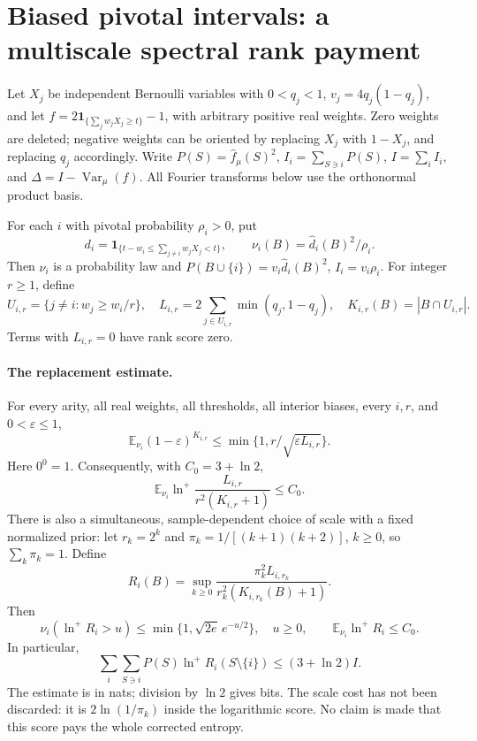 \section{Biased pivotal intervals: a multiscale spectral rank payment}
\label{a041:replacement}
Let $X_j$ be independent Bernoulli variables with $0<q_j<1$,
$v_j=4q_j(1-q_j)$, and let
$f=2\mathbf1_{\{\sum_j w_jX_j\ge t\}}-1$, with arbitrary positive real
weights. Zero weights are deleted; negative weights can be oriented by
replacing $X_j$ with $1-X_j$, and replacing $q_j$ accordingly.
Write $P(S)=\widehat f_\mu(S)^2$, $I_i=\sum_{S\ni i}P(S)$,
$I=\sum_iI_i$, and $\Delta=I-\operatorname{Var}_\mu(f)$.
All Fourier transforms below use the orthonormal product basis.

For each $i$ with pivotal probability $\rho_i>0$, put
\[
 d_i=\mathbf1_{\{t-w_i\le\sum_{j\ne i}w_jX_j<t\}},\qquad
 \nu_i(B)=\widehat d_i(B)^2/\rho_i.
\]
Then $\nu_i$ is a probability law and
$P(B\cup\{i\})=v_i\widehat d_i(B)^2$, $I_i=v_i\rho_i$.
For integer $r\ge1$, define
\[
 U_{i,r}=\{j\ne i:w_j\ge w_i/r\},\quad
 L_{i,r}=2\sum_{j\in U_{i,r}}\min(q_j,1-q_j),\quad
 K_{i,r}(B)=|B\cap U_{i,r}|.
\]
Terms with $L_{i,r}=0$ have rank score zero.

\paragraph{The replacement estimate.}
For every arity, all real weights, all thresholds, all interior biases,
every $i,r$, and $0<\varepsilon\le1$,
\begin{equation}\label{a041:noise}
 \mathbb E_{\nu_i}(1-\varepsilon)^{K_{i,r}}
 \le \min\{1,r/\sqrt{\varepsilon L_{i,r}}\}.
\end{equation}
Here $0^0=1$. Consequently, with $C_0=3+\ln2$,
\begin{equation}\label{a041:fixedrank}
 \mathbb E_{\nu_i}\ln^+
 \frac{L_{i,r}}{r^2(K_{i,r}+1)}\le C_0.
\end{equation}
There is also a simultaneous, sample-dependent choice of scale with a
fixed normalized prior: let $r_k=2^k$ and
$\pi_k=1/[(k+1)(k+2)]$, $k\ge0$, so $\sum_k\pi_k=1$. Define
\[
 R_i(B)=\sup_{k\ge0}
 \frac{\pi_k^2L_{i,r_k}}{r_k^2(K_{i,r_k}(B)+1)}.
\]
Then
\begin{equation}\label{a041:multiscale}
 \nu_i(\ln^+R_i>u)\le
 \min\{1,\sqrt{2e}\,e^{-u/2}\},\quad u\ge0,
 \qquad \mathbb E_{\nu_i}\ln^+R_i\le C_0.
\end{equation}
In particular,
\begin{equation}\label{a041:global}
 \sum_i\sum_{S\ni i}P(S)\ln^+R_i(S\setminus\{i\})
 \le (3+\ln2)I.
\end{equation}
The estimate is in nats; division by $\ln2$ gives bits.
The scale cost has not been discarded: it is $2\ln(1/\pi_k)$ inside
the logarithmic score. No claim is made that this score pays the whole
corrected entropy.

